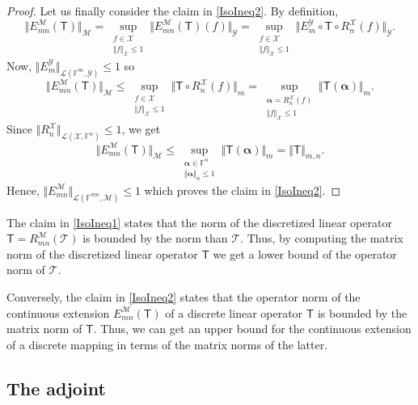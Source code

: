 \documentclass[a4paper]{paper}
\newcommand{\VecSpace}[1]{\mathscr{#1}}
\newcommand{\Field}{\mathbb{F}}
\newcommand{\Op}[1]{\mathcal{#1}}
\newcommand{\DiscOp}[1]{\mathsf{#1}}
\newcommand*{\EXT}[2]{\ensuremath{E_{#1}^{#2}}}
\newcommand*{\REST}[2]{\ensuremath{R_{#1}^{#2}}}
\newcommand*{\RnX}{\ensuremath{\REST{n}{\VecSpace{X}}}}
\newcommand*{\EmY}{\ensuremath{\EXT{m}{\VecSpace{Y}}}}
\newcommand{\valpha}{\boldsymbol{\alpha}}
\begin{document}
\begin{proof}
Let us finally consider the claim in \eqref{IsoIneq2}. By definition,
\[
  \bigl\Vert E_{m n}^{\VecSpace{M}}(\DiscOp{T}) \bigr\Vert_{\VecSpace{M}}
  = 
  \sup_{\substack{f \in \VecSpace{X} \\ \Vert f \Vert_{\VecSpace{X}} \leq 1}}
    \bigl\Vert E_{m n}^{\VecSpace{M}}(\DiscOp{T})(f) \bigr\Vert_{\VecSpace{Y}}    
  =   
  \sup_{\substack{f \in \VecSpace{X} \\ \Vert f \Vert_{\VecSpace{X}} \leq 1}}
    \bigl\Vert \EmY \circ \DiscOp{T} \circ \RnX(f) \bigr\Vert_{\VecSpace{Y}}.
\]
Now, $\Vert \EmY \Vert_{\VecSpace{L}(\Field^m, \VecSpace{Y})} \leq 1$  so
\[
  \bigl\Vert E_{m n}^{\VecSpace{M}}(\DiscOp{T}) \bigr\Vert_{\VecSpace{M}}
  \leq 
  \sup_{\substack{f \in \VecSpace{X} \\ \Vert f \Vert_{\VecSpace{X}} \leq 1}}
    \bigl\Vert \DiscOp{T} \circ \RnX(f) \bigr\Vert_{m}
  =
  \sup_{\substack{\valpha = \RnX\!(f) \\ \Vert f \Vert_{\VecSpace{X}}\leq1}}
    \bigl\Vert \DiscOp{T}(\valpha) \bigr\Vert_{m}.
\]
Since $\Vert \RnX \Vert_{\VecSpace{L}(\VecSpace{X},\Field^n)} \leq 1$,
we get 
\[
  \bigl\Vert E_{m n}^{\VecSpace{M}}(\DiscOp{T}) \bigr\Vert_{\VecSpace{M}}
  \leq 
  \sup_{\substack{ \valpha \in \Field^n \\ \Vert \valpha \Vert_{n} \leq1}}
    \bigl\Vert \DiscOp{T}(\valpha) \bigr\Vert_{m}
  =
    \Vert \DiscOp{T} \Vert_{m,n}.
\]
Hence, $\Vert E_{m n}^{\VecSpace{M}} \Vert_{\VecSpace{L}(\Field^{mn},\VecSpace{M})} \leq 1$ which 
proves the claim in \eqref{IsoIneq2}.
\end{proof}

\begin{remark}
The claim in \eqref{IsoIneq1} states that the norm of the discretized linear operator $\DiscOp{T}=R_{m n}^{\VecSpace{M}}(\Op{T})$ 
is bounded by the norm than $\Op{T}$. Thus, by computing the matrix norm of the discretized linear operator $\DiscOp{T}$
we get a lower bound of the operator norm of $\Op{T}$. 

Conversely, the claim in \eqref{IsoIneq2} states that the operator norm of the continuous extension 
$E_{m n}^{\VecSpace{M}}(\DiscOp{T})$ of a discrete linear operator $\DiscOp{T}$ is bounded by the 
matrix norm of $\DiscOp{T}$. Thus, we can get an upper bound for the continuous extension of a 
discrete mapping in terms of the matrix norms of the latter.
\end{remark}

\subsection{The adjoint}
\end{document}
